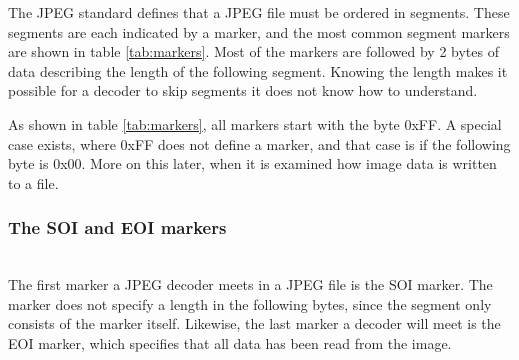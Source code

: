 \begin{infobox}
The JPEG standard defines that a JPEG file must be ordered in segments.
These segments are each indicated by a marker, and the most common segment markers are shown in table \ref{tab:markers}.
Most of the markers are followed by 2 bytes of data describing the length of the following segment.
Knowing the length makes it possible for a decoder to skip segments it does not know how to understand. 

As shown in table \ref{tab:markers}, all markers start with the byte 0xFF.
A special case exists, where 0xFF does not define a marker, and that case is if the following byte is 0x00.
More on this later, when it is examined how image data is written to a file.

\subsubsection{The SOI and EOI markers}
\begin{centering}
\hspace{1.2cm} 
\end{centering}\\
The first marker a JPEG decoder meets in a JPEG file is the SOI marker. 
The marker does not specify a length in the following bytes, since the segment only consists of the marker itself.
Likewise, the last marker a decoder will meet is the EOI marker, which specifies that all data has been read from the image.


\end{infobox}
